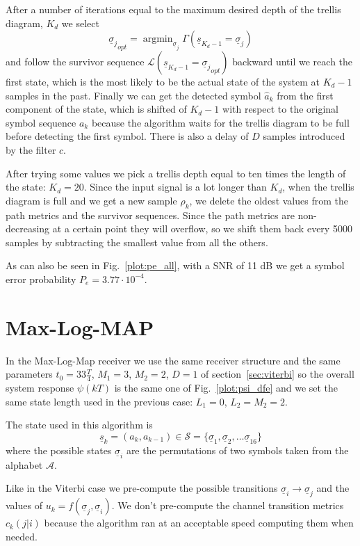 \documentclass[a4paper,oneside]{article}
\renewcommand{\vec}[1]{\underline{#1}}
\DeclareMathOperator*{\argmin}{argmin}
\newcommand{\vsigma}[0]{\vec{\sigma}}
\begin{document}
After a number of iterations equal to the maximum desired depth of the
trellis diagram, $K_d$ we select
\begin{equation}
  {\vsigma_j}_{opt} = \argmin_{\vsigma_j} \Gamma(\vec{s}_{K_d-1} = \vec{\sigma}_j)
\end{equation}
and follow the survivor sequence $\mathcal{L}(\vec{s}_{K_d-1} =
{\vsigma_j}_{opt})$ backward until we reach the first state, which is
the most likely to be the actual state of the system at $K_d-1$
samples in the past. Finally we can get the detected symbol
$\hat{a}_{k}$ from the first component of the state, which is shifted
of $K_d-1$ with respect to the original symbol sequence $a_k$ because
the algorithm waits for the trellis diagram to be full before
detecting the first symbol. There is also a delay of $D$ samples
introduced by the filter $c$.

After trying some values we pick a trellis depth equal to ten times
the length of the state: $K_d = 20$. Since the input signal is a lot
longer than $K_d$, when the trellis diagram is full and we get a new
sample $\rho_k$, we delete the oldest values from the path metrics and
the survivor sequences. Since the path metrics are non-decreasing at a
certain point they will overflow, so we shift them back every 5000
samples by subtracting the smallest value from all the others.

As can also be seen in Fig.~\ref{plot:pe_all}, with a SNR of 11 dB we
get a symbol error probability {\color{red}$P_e = 3.77 \cdot 10^{-4}$.}
\section{Max-Log-MAP}
In the Max-Log-Map receiver we use the same receiver structure and the
same parameters $t_0 = 33\frac{T}{4}$, $M_1 = 3$, $M_2 = 2$, $D=1$ of
section~\ref{sec:viterbi} so the overall system response $\psi(kT)$ is
the same one of Fig.~\ref{plot:psi_dfe} and we set the same state
length used in the previous case: $L_1 = 0$, $L_2 = M_2 = 2$.

The state used in this algorithm is
\begin{equation}
  \vec{s}_k = (a_k,a_{k-1}) \in \mathcal{S} = \{ \vec{\sigma}_1, \vec{\sigma}_2, \dots \vec{\sigma}_{16} \}
\end{equation}
where the possible states $\vsigma_i$ are the permutations of two
symbols taken from the alphabet $\mathcal{A}$.

Like in the Viterbi case we pre-compute the possible transitions
$\vsigma_i \rightarrow \vsigma_j$ and the values of $u_k =
f(\vsigma_j, \vsigma_i)$. We don't pre-compute the channel transition
metrics $c_k(j | i)$ because the algorithm ran at an acceptable speed
computing them when needed.
\end{document}
